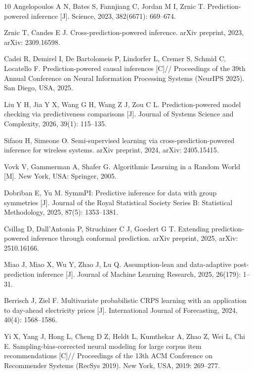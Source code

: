 \documentclass[a4paper, AutoFakeBold, UTF8]{ctexrep}
\theoremstyle{plain}
\numberwithin{equation}{chapter}
\begin{document}
\clearpage
{}
{}
\begin{thebibliography}{10}
Angelopoulos A N, Bates S, Fannjiang C, Jordan M I, Zrnic T. Prediction-powered inference [J]. Science, 2023, 382(6671): 669--674.

Zrnic T, Candes E J. Cross-prediction-powered inference. arXiv preprint, 2023, arXiv: 2309.16598.

Cadei R, Demirel I, De Bartolomeis P, Lindorfer L, Cremer S, Schmid C, Locatello F. Prediction-powered causal inferences [C]// Proceedings of the 39th Annual Conference on Neural Information Processing Systems (NeurIPS 2025). San Diego, USA, 2025.

Liu Y H, Jia Y X, Wang G H, Wang Z J, Zou C L. Prediction-powered model checking via predictiveness comparisons [J]. Journal of Systems Science and Complexity, 2026, 39(1): 115--135.

Sifaou H, Simeone O. Semi-supervised learning via cross-prediction-powered inference for wireless systems. arXiv preprint, 2024, arXiv: 2405.15415.

Vovk V, Gammerman A, Shafer G. Algorithmic Learning in a Random World [M]. New York, USA: Springer, 2005.

Dobriban E, Yu M. SymmPI: Predictive inference for data with group symmetries [J]. Journal of the Royal Statistical Society Series B: Statistical Methodology, 2025, 87(5): 1353--1381.

Csillag D, Dall'Antonia P, Struchiner C J, Goedert G T. Extending prediction-powered inference through conformal prediction. arXiv preprint, 2025, arXiv: 2510.16166.

Miao J, Miao X, Wu Y, Zhao J, Lu Q. Assumption-lean and data-adaptive post-prediction inference [J]. Journal of Machine Learning Research, 2025, 26(179): 1--31.

Berrisch J, Ziel F. Multivariate probabilistic CRPS learning with an application to day-ahead electricity prices [J]. International Journal of Forecasting, 2024, 40(4): 1568--1586.

Yi X, Yang J, Hong L, Cheng D Z, Heldt L, Kumthekar A, Zhao Z, Wei L, Chi E. Sampling-bias-corrected neural modeling for large corpus item recommendations [C]// Proceedings of the 13th ACM Conference on Recommender Systems (RecSys 2019). New York, USA, 2019: 269--277.


\end{thebibliography}
\end{document}
